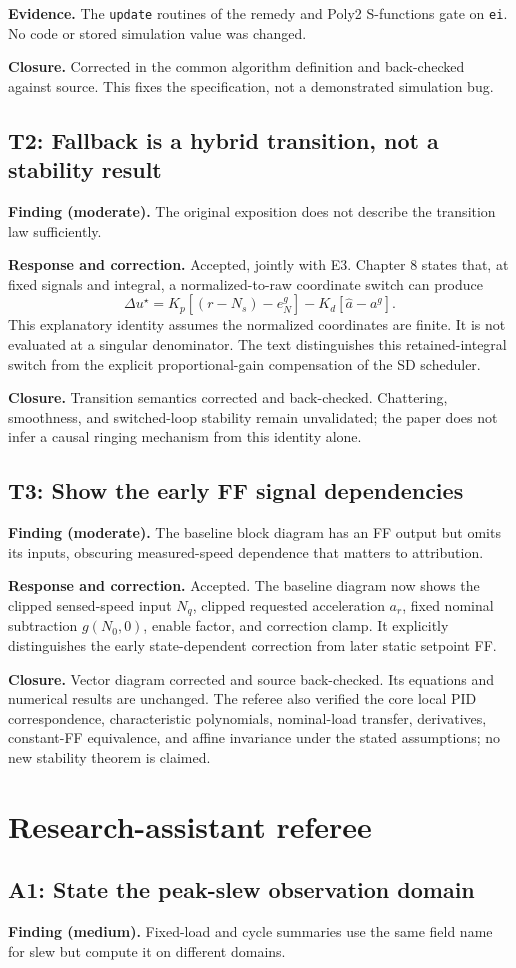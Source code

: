 \documentclass[11pt,a4paper]{article}
\newcommand{\finding}[2]{\subsection*{#1: #2}}
\begin{document}
\textbf{Evidence.} The \texttt{update} routines of the remedy and Poly2 S-functions gate on \texttt{ei}. No code or stored simulation value was changed.

\textbf{Closure.} Corrected in the common algorithm definition and back-checked against source. This fixes the specification, not a demonstrated simulation bug.

\finding{T2}{Fallback is a hybrid transition, not a stability result}
\textbf{Finding (moderate).} The original exposition does not describe the transition law sufficiently.

\textbf{Response and correction.} Accepted, jointly with E3. Chapter 8 states that, at fixed signals and integral, a normalized-to-raw coordinate switch can produce
\begin{equation*}
\Delta u^\star=K_p[(r-N_s)-e_N^g]-K_d[\hat a-a^g].
\end{equation*}
This explanatory identity assumes the normalized coordinates are finite. It is not evaluated at a singular denominator. The text distinguishes this retained-integral switch from the explicit proportional-gain compensation of the SD scheduler.

\textbf{Closure.} Transition semantics corrected and back-checked. Chattering, smoothness, and switched-loop stability remain unvalidated; the paper does not infer a causal ringing mechanism from this identity alone.

\finding{T3}{Show the early FF signal dependencies}
\textbf{Finding (moderate).} The baseline block diagram has an FF output but omits its inputs, obscuring measured-speed dependence that matters to attribution.

\textbf{Response and correction.} Accepted. The baseline diagram now shows the clipped sensed-speed input $N_q$, clipped requested acceleration $a_r$, fixed nominal subtraction $g(N_0,0)$, enable factor, and correction clamp. It explicitly distinguishes the early state-dependent correction from later static setpoint FF.

\textbf{Closure.} Vector diagram corrected and source back-checked. Its equations and numerical results are unchanged. The referee also verified the core local PID correspondence, characteristic polynomials, nominal-load transfer, derivatives, constant-FF equivalence, and affine invariance under the stated assumptions; no new stability theorem is claimed.

\clearpage
\section*{Research-assistant referee}
\finding{A1}{State the peak-slew observation domain}
\textbf{Finding (medium).} Fixed-load and cycle summaries use the same field name for slew but compute it on different domains.
\end{document}

